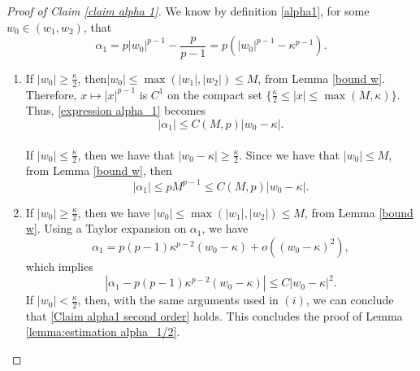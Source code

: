 \documentclass[11pt,a4paper]{article}
\newcommand{\1}{\mathbbm{1}}
\numberwithin{equation}{section}
\theoremstyle{remark}
\begin{document}
\begin{proof}[Proof of Claim \ref{claim alpha 1}]
We know by definition \eqref{alpha1}, for some $w_0\in (w_1,w_2)$, that 
\begin{equation}\label{expression alpha_1}
\alpha_1= p|w_0|^{p-1}-\frac{p}{p-1}= p(|w_0|^{p-1}-\kappa^{p-1}).
\end{equation}
\begin{enumerate}[label=(\roman*)]
\item  If $|w_0|\geq \frac{\kappa}{2}$, then$|w_0|\leq \max(|w_1|,|w_2|)\leq M$, from Lemma \ref{bound w}. Therefore, $x\mapsto|x|^{p-1}$ is $C^1$ on the compact set $\{\frac{\kappa}{2}\leq |x|\leq \max(M,\kappa)\}$. Thus, \eqref{expression alpha_1} becomes
$$|\alpha_1|\leq C(M,p)|w_0-\kappa|.$$\\
If $|w_0|\leq \frac{\kappa}{2}$, then we have that $|w_0-\kappa|\geq \frac{\kappa}{2}$. Since we have that $|w_0|\leq M$, from Lemma \ref{bound w}, then
$$|\alpha_1|\leq pM^{p-1}\leq C(M,p)|w_0-\kappa|.$$
\item If $|w_0|\geq\frac{\kappa}{2}$, then we have $|w_0|\leq \max(|w_1|,|w_2|)\leq M$, from Lemma \ref{bound w}. Using a Taylor expansion on $\alpha_1$, we have
$$\alpha_1=p(p-1)\kappa^{p-2}(w_0-\kappa)+o((w_0-\kappa)^2),$$
which implies 
$$|\alpha_1-p(p-1)\kappa^{p-2}(w_0-\kappa)|\leq C|w_0-\kappa|^2.$$
If $|w_0|<\frac{\kappa}{2}$, then, with the same arguments used in $(i)$, we can conclude that \ref{Claim alpha1 second order} holds. This concludes the proof of Lemma \ref{lemma:estimation alpha_1/2}.
\end{enumerate}
\end{proof}
\end{document}
